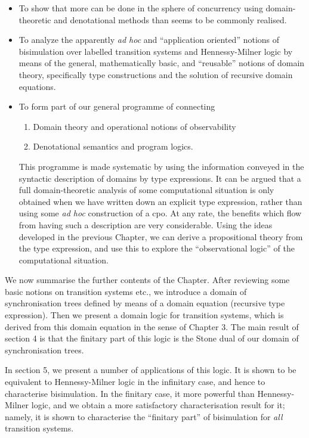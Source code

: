 \begin{itemize}

\item To show that more can be done in the sphere of concurrency using domain-theoretic and denotational methods than seems to be commonly realised.

\item To analyze the apparently {\it ad hoc} and ``application oriented'' notions of bisimulation over labelled transition systems and Hennessy-Milner logic by means of the general, mathematically basic, and ``reusable'' notions of domain theory, specifically type constructions and the solution of recursive domain equations.

\item To form part of our general programme of connecting
\begin{enumerate}

\item Domain theory and operational notions of observability

\item Denotational semantics and program logics.
\end{enumerate}

This programme is made systematic by using the information conveyed in the syntactic description of domains by type expressions.
It can be argued that a full domain-theoretic analysis of some computational situation is only obtained when we have written down an explicit type expression, rather than using some {\it ad hoc} construction of a cpo.
At any rate, the benefits which flow from having such a description are very considerable.
Using the ideas developed in the previous Chapter, we can derive a propositional theory from the type expression, and use this to explore the ``observational logic'' of the computational situation.
\end{itemize}

We now summarise the further contents of the Chapter.
After reviewing some basic notions on transition systems etc., we introduce a domain of synchronisation trees defined by means of a domain equation (recursive type expression).
Then we present a domain logic for transition systems, which is derived from this domain equation in the sense of Chapter 3.
The main result of section 4 is that the finitary part of this logic is the Stone dual of our domain of synchronisation trees.

In section 5, we present a number of applications of this logic.
It is shown to be equivalent to Hennessy-Milner logic in the infinitary case, and hence to characterise bisimulation.
In the finitary case, it more powerful than Hennessy-Milner logic, and we obtain a more satisfactory characterisation result for it; namely, it is shown to characterise the ``finitary part'' of bisimulation for {\em all} transition systems.

